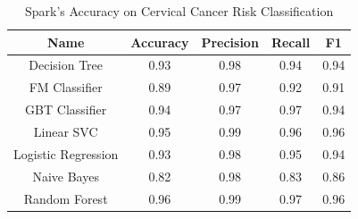 \documentclass[12pt]{report}
\begin{document}


\begin{table}
    \caption{Spark's Accuracy on Cervical Cancer Risk Classification}
    \label{tab:model-performance-Spark's Accuracy on Cervical Cancer}
    
    \begin{center}
    \begin{tabular}{|c|c|c|c|c|}
    \hline
    \textbf{Name} & \textbf{Accuracy} & \textbf{Precision} & \textbf{Recall} & \textbf{F1} \\ \hline
    Decision Tree & 0.93 & 0.98 & 0.94 & 0.94 \\ \hline
    FM Classifier & 0.89 & 0.97 & 0.92 & 0.91 \\ \hline
    GBT Classifier & 0.94 & 0.97 & 0.97 & 0.94 \\ \hline
    Linear SVC & 0.95 & 0.99& 0.96 & 0.96 \\ \hline
    Logistic Regression  & 0.93 & 0.98 & 0.95 & 0.94 \\ \hline
    Naive Bayes & 0.82 & 0.98 & 0.83 & 0.86 \\ \hline
    Random Forest & 0.96 & 0.99 & 0.97 & 0.96 \\ \hline
    
    \end{tabular}
    \end{center}
\end{table}




\end{document}
